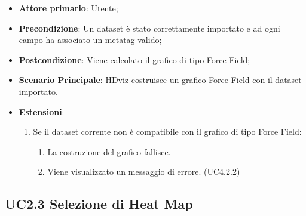 \begin{itemize}

    \item \textbf{Attore primario}: Utente;

    \item \textbf{Precondizione}:   Un dataset è stato correttamente importato e ad ogni campo ha associato
                                    un metatag valido;

    \item \textbf{Postcondizione}:  Viene calcolato il grafico di tipo Force Field;
	
	\item \textbf{Scenario Principale}: HDviz costruisce un grafico Force Field con il dataset importato.
	\item \textbf{Estensioni}:
	\begin{enumerate}
		\item Se il dataset corrente non è compatibile con il grafico di tipo Force Field:
		\begin{enumerate}
			\item La costruzione del grafico fallisce.
			\item Viene visualizzato un messaggio di errore. (UC4.2.2)
		\end{enumerate}
	\end{enumerate}
\end{itemize}


\subsection{UC2.3 Selezione di Heat Map}

